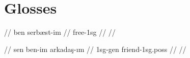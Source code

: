 \documentclass{article}
\begin{document}
\newpage\section{Glosses}

\ex
\begingl
\gla {}  //
\glb ben serb\ae st-im //
 free-{\sc 1sg} //
 //
\endgl
\xe

\ex
\begingl
\gla {}   //
\glb sen ben-im arkada\c{s}-\i m //
 {\sc 1sg}-{\sc gen} friend-{\sc 1sg.poss} //
 //
\endgl
\xe
\end{document}
